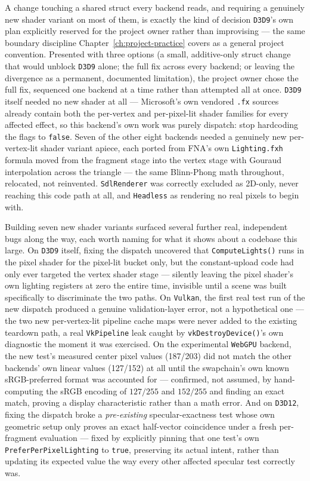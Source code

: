 A change touching a shared struct every backend reads, and requiring a genuinely new shader
variant on most of them, is exactly the kind of decision \texttt{D3D9}'s own plan explicitly
reserved for the project owner rather than improvising --- the same boundary discipline
Chapter~\ref{ch:project-practice} covers as a general project convention. Presented with three
options (a small, additive-only struct change that would unblock \texttt{D3D9} alone; the full
fix across every backend; or leaving the divergence as a permanent, documented limitation), the
project owner chose the full fix, sequenced one backend at a time rather than attempted all at
once. \texttt{D3D9} itself needed no new shader at all --- Microsoft's own vendored \texttt{.fx}
sources already contain both the per-vertex and per-pixel-lit shader families for every affected
effect, so this backend's own work was purely dispatch: stop hardcoding the flags to
\texttt{false}. Seven of the other eight backends needed a genuinely new per-vertex-lit shader
variant apiece, each ported from FNA's own \texttt{Lighting.fxh} formula moved from the fragment
stage into the vertex stage with Gouraud interpolation across the triangle --- the same
Blinn-Phong math throughout, relocated, not reinvented. \texttt{SdlRenderer} was correctly
excluded as 2D-only, never reaching this code path at all, and \texttt{Headless} as rendering no
real pixels to begin with.

Building seven new shader variants surfaced several further real, independent bugs along the
way, each worth naming for what it shows about a codebase this large. On \texttt{D3D9} itself,
fixing the dispatch uncovered that \texttt{ComputeLights()} runs in the pixel shader for the
pixel-lit bucket only, but the constant-upload code had only ever targeted the vertex shader
stage --- silently leaving the pixel shader's own lighting registers at zero the entire time,
invisible until a scene was built specifically to discriminate the two paths. On \texttt{Vulkan},
the first real test run of the new dispatch produced a genuine validation-layer error, not a
hypothetical one --- the two new per-vertex-lit pipeline cache maps were never added to the
existing teardown path, a real \texttt{VkPipeline} leak caught by
\texttt{vkDestroyDevice()}'s own diagnostic the moment it was exercised. On the experimental
\texttt{WebGPU} backend, the new test's measured center pixel values (187/203) did not match the
other backends' own linear values (127/152) at all until the swapchain's own known
sRGB-preferred format was accounted for --- confirmed, not assumed, by hand-computing the sRGB
encoding of $127/255$ and $152/255$ and finding an exact match, proving a display characteristic
rather than a math error. And on \texttt{D3D12}, fixing the dispatch broke a \emph{pre-existing}
specular-exactness test whose own geometric setup only proves an exact half-vector coincidence
under a fresh per-fragment evaluation --- fixed by explicitly pinning that one test's own
\texttt{PreferPerPixelLighting} to \texttt{true}, preserving its actual intent, rather than
updating its expected value the way every other affected specular test correctly was.

